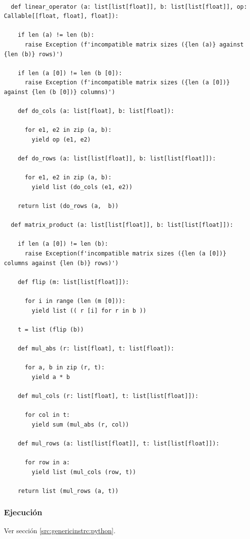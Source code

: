 \documentclass{article}[12pt,a4paper]
\begin{document}
\begin{verbatim}

  def linear_operator (a: list[list[float]], b: list[list[float]], op: Callable[[float, float], float]):

    if len (a) != len (b):
      raise Exception (f'incompatible matrix sizes ({len (a)} against {len (b)} rows)')

    if len (a [0]) != len (b [0]):
      raise Exception (f'incompatible matrix sizes ({len (a [0])} against {len (b [0])} columns)')

    def do_cols (a: list[float], b: list[float]):

      for e1, e2 in zip (a, b):
        yield op (e1, e2)

    def do_rows (a: list[list[float]], b: list[list[float]]):
    
      for e1, e2 in zip (a, b):
        yield list (do_cols (e1, e2))

    return list (do_rows (a,  b))

  def matrix_product (a: list[list[float]], b: list[list[float]]):

    if len (a [0]) != len (b):
      raise Exception(f'incompatible matrix sizes ({len (a [0])} columns against {len (b)} rows)')

    def flip (m: list[list[float]]):

      for i in range (len (m [0])):
        yield list (( r [i] for r in b ))

    t = list (flip (b))

    def mul_abs (r: list[float], t: list[float]):

      for a, b in zip (r, t):
        yield a * b

    def mul_cols (r: list[float], t: list[list[float]]):

      for col in t:
        yield sum (mul_abs (r, col))

    def mul_rows (a: list[list[float]], t: list[list[float]]):

      for row in a:
        yield list (mul_cols (row, t))

    return list (mul_rows (a, t))

\end{verbatim}

\subsubsection{Ejecución}

Ver sección \ref{src:genericinstrc:python}.
\end{document}
